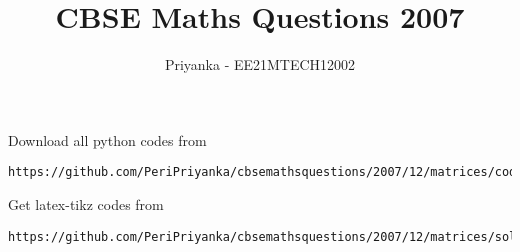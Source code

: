 \documentclass[journal,12pt,twocolumn]{IEEEtran}
\begin{document}
     \def\rightbox#1{\makebox[0in][r]{#1}}
     \def\centbox#1{\makebox[0in]{#1}}
     \def\topbox#1{\raisebox{-\baselineskip}[0in][0in]{#1}}
     \def\midbox#1{\raisebox{-0.5\baselineskip}[0in][0in]{#1}}
\vspace{3cm}
\title{CBSE Maths Questions 2007}
\author{Priyanka - EE21MTECH12002}
\maketitle
\newpage
\bigskip
\renewcommand{\thefigure}{\theenumi}
\renewcommand{\thetable}{\theenumi}
Download all python codes from 
\begin{lstlisting}
https://github.com/PeriPriyanka/cbsemathsquestions/2007/12/matrices/codes/solutions
\end{lstlisting}
%
Get latex-tikz codes from 
%
\begin{lstlisting}
https://github.com/PeriPriyanka/cbsemathsquestions/2007/12/matrices/solutions
\end{lstlisting}
\end{document}
